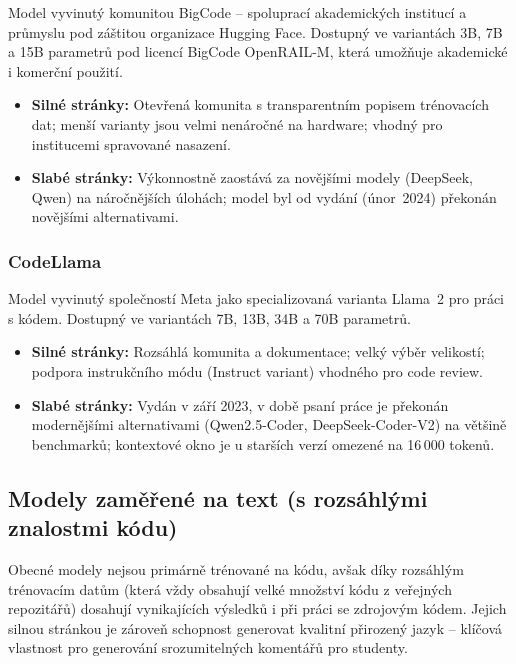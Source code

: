 Model vyvinutý komunitou BigCode \cite{starcoder22024} -- spoluprací akademických institucí a průmyslu pod záštitou organizace Hugging Face.
Dostupný ve variantách 3B, 7B a 15B parametrů pod licencí BigCode OpenRAIL-M, která umožňuje akademické i komerční použití.

\begin{itemize}
    \item \textbf{Silné stránky:} Otevřená komunita s transparentním popisem trénovacích dat; menší varianty jsou velmi nenáročné na hardware; vhodný pro institucemi spravované nasazení.
    \item \textbf{Slabé stránky:} Výkonnostně zaostává za novějšími modely (DeepSeek, Qwen) na náročnějších úlohách; model byl od vydání (únor~2024) překonán novějšími alternativami.
\end{itemize}

\subsubsection*{CodeLlama}

Model vyvinutý společností Meta \cite{codellama2023} jako specializovaná varianta Llama~2 pro práci s kódem.
Dostupný ve variantách 7B, 13B, 34B a 70B parametrů.

\begin{itemize}
    \item \textbf{Silné stránky:} Rozsáhlá komunita a dokumentace; velký výběr velikostí; podpora instrukčního módu (Instruct variant) vhodného pro code review.
    \item \textbf{Slabé stránky:} Vydán v září 2023, v době psaní práce je překonán modernějšími alternativami (Qwen2.5-Coder, DeepSeek-Coder-V2) na většině benchmarků; kontextové okno je u starších verzí omezené na 16\,000 tokenů.
\end{itemize}

\subsection{Modely zaměřené na text (s rozsáhlými znalostmi kódu)}
\label{subsec:models-general}

Obecné modely nejsou primárně trénované na kódu, avšak díky rozsáhlým trénovacím datům (která vždy obsahují velké množství kódu z veřejných repozitářů) dosahují vynikajících výsledků i při práci se zdrojovým kódem.
Jejich silnou stránkou je zároveň schopnost generovat kvalitní přirozený jazyk -- klíčová vlastnost pro generování srozumitelných komentářů pro studenty.

